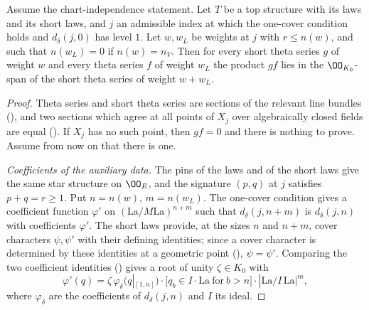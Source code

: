 \begin{proposition}\label{pf:onto2:shortmul}
Assume the chart-independence statement. Let $T$ be a top structure with its laws and its short laws, and $j$ an admissible index
at which the one-cover condition holds and $d_\delta(j,0)$ has level $1$. Let $w,w_L$ be weights at $j$ with $r\le n(w)$, and such
that $n(w_L)=0$ if $n(w)=n_V$. Then for every short theta series $g$ of weight $w$ and every theta series $f$ of weight $w_L$ the
product $gf$ lies in the $\OO_{K_0}$-span of the short theta series of weight $w+w_L$.
\end{proposition}

\begin{proof}
Theta series and short theta series are sections of the relevant line bundles (), and
two sections which agree at all points of $X_j$ over algebraically closed fields are equal
(). If $X_j$ has no such point, then $gf=0$ and there is nothing to prove.
Assume from now on that there is one.

\emph{Coefficients of the auxiliary data.} The pins of the laws and of the short laws give the same star structure on $\OO_E$, and
the signature $(p,q)$ at $j$ satisfies $p+q=r\ge1$. Put $n=n(w)$, $m=n(w_L)$. The one-cover condition gives a coefficient function
$\varphi'$ on $(\mathrm{La}/M\mathrm{La})^{n+m}$ such that $d_\delta(j,n+m)$ is $d_\delta(j,n)$ with coefficients $\varphi'$. The short
laws provide, at the sizes $n$ and $n+m$, cover characters $\psi,\psi'$ with their defining identities; since a cover character is
determined by these identities at a geometric point (), $\psi=\psi'$. Comparing the
two coefficient identities () gives a root of unity $\zeta\in K_0$ with
\begin{equation}\label{eq:pf:onto2:phiprime}
\varphi'(q)=\zeta\,\varphi_\delta\bigl(q|_{[1,n]}\bigr)\cdot\bigl[q_b\in I\cdot\mathrm{La}\ \text{for}\ b>n\bigr]\cdot|\mathrm{La}/I\,\mathrm{La}|^{m},
\end{equation}
where $\varphi_\delta$ are the coefficients of $d_\delta(j,n)$ and $I$ its ideal.


\end{proof}
